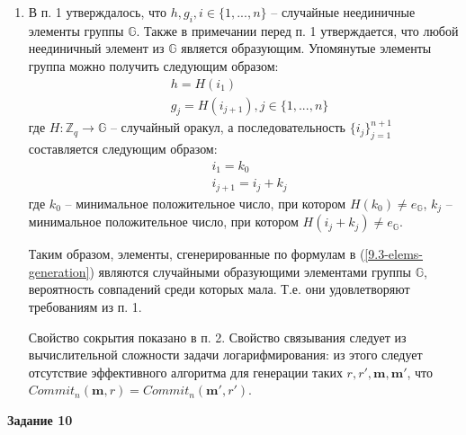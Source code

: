 \documentclass[12pt, a4paper]{extarticle}
\newenvironment*{dummyenv}{}{}
\newcommand{\mysection}[1]{
    \addcontentsline{toc}{section}{#1}
    \begin{dummyenv}
        \bfseries\large #1
    \end{dummyenv}
}
\begin{document}
\begin{enumerate}
    \item В п. 1 утверждалось, что $h, g_i, i \in \{1, ...,n\}$ -- случайные неединичные элементы 
        группы $\mathbb{G}$. Также в примечании перед п. 1 утверждается, что любой неединичный 
    	элемент из $\mathbb{G}$ является образующим. Упомянутые элементы группа можно получить 
    	следующим образом:
        \begin{equation}
            \begin{split}
                & h = H(i_1) \\
                & g_j = H(i_{j + 1}), j \in \{1, ..., n\}
            \end{split}
            \label{9.3-elems-generation}
        \end{equation}
        где $H:\mathbb{Z}_q \to \mathbb{G}$ -- случайный оракул, а последовательность 
        $\{i_j\}_{j=1}^{n+1}$ составляется следующим образом:
        \begin{equation*}
            \begin{split}
                & i_1 = k_0 \\
                & i_{j+1} = i_j + k_j
            \end{split}
        \end{equation*}
        где $k_0$ -- минимальное положительное число, при котором $H(k_0) \ne e_{\mathbb{G}}$, 
        $k_j$ -- минимальное положительное число, при котором $H(i_j + k_j) \ne e_{\mathbb{G}}$.
        
        Таким образом, элементы, сгенерированные по формулам в (\ref{9.3-elems-generation}) являются 
        случайными образующими элементами группы $\mathbb{G}$, вероятность совпадений среди которых 
        мала. Т.е. они удовлетворяют требованиям из п. 1.
        
        Свойство сокрытия показано в п. 2. Свойство связывания следует из вычислительной сложности 
        задачи логарифмирования: из этого следует отсутствие эффективного алгоритма для генерации 
        таких $r, r', \mathbf{m}, \mathbf{m'}$, что $Commit_n(\mathbf{m}, r) = 
        Commit_n(\mathbf{m'}, r')$.
\end{enumerate}

\mysection{Задание 10}
\end{document}
